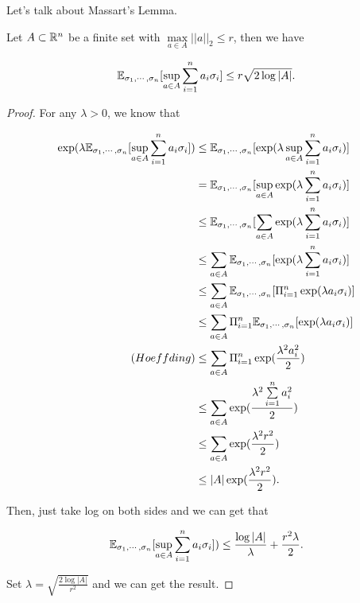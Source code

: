 \documentclass[../main.tex]{subfiles}
\begin{document}
	Let's talk about Massart's Lemma.
	
	\begin{theorem}
		Let $A \subset \mathbb{R}^n$ be a finite set with $\max\limits_{a\in A} ||a||_2 \leq r$, then we have
		
		\begin{equation}
			\mathbb{E}_{\sigma_1, \cdots, \sigma_n} [\sup\limits_{a\in A} \sum\limits_{i=1}^n a_i \sigma_i] \leq r \sqrt{2\log |A|}.
		\end{equation}
	\end{theorem}

	\begin{proof}
		For any $\lambda > 0$, we know that 
		
		\begin{equation*}
			\begin{aligned}
				\exp(\lambda \mathbb{E}_{\sigma_1, \cdots, \sigma_n} [\sup\limits_{a\in A} \sum\limits_{i=1}^n a_i \sigma_i]) &  \leq \mathbb{E}_{\sigma_1, \cdots, \sigma_n} [\exp(\lambda  \sup\limits_{a\in A} \sum\limits_{i=1}^n a_i \sigma_i)] \\
				& = \mathbb{E}_{\sigma_1, \cdots, \sigma_n} [\sup\limits_{a\in A} \exp(\lambda   \sum\limits_{i=1}^n a_i \sigma_i)] \\
				& \leq \mathbb{E}_{\sigma_1, \cdots, \sigma_n} [\sum\limits_{a\in A} \exp(\lambda   \sum\limits_{i=1}^n a_i \sigma_i)] \\
				& \leq \sum\limits_{a\in A} \mathbb{E}_{\sigma_1, \cdots, \sigma_n} [ \exp(\lambda   \sum\limits_{i=1}^n a_i \sigma_i)] \\
				& \leq \sum\limits_{a\in A} \mathbb{E}_{\sigma_1, \cdots, \sigma_n} [ \Pi_{i=1}^n \exp(\lambda  a_i \sigma_i)] \\
				& \leq \sum\limits_{a\in A}  \Pi_{i=1}^n  \mathbb{E}_{\sigma_1, \cdots, \sigma_n} [\exp(\lambda  a_i \sigma_i)] \\
			(Hoeffding)	& \leq \sum\limits_{a\in A}  \Pi_{i=1}^n  \exp(\frac{\lambda^2 a_i^2}{2})\\
				& \leq \sum\limits_{a\in A}   \exp(\frac{\lambda^2  \sum\limits_{i=1}^n a_i^2}{2}) \\
				& \leq \sum\limits_{a\in A}   \exp(\frac{\lambda^2  r^2}{2}) \\
				& \leq |A| \exp(\frac{\lambda^2  r^2}{2}).
			\end{aligned}
		\end{equation*}
		
		Then, just take log on both sides and we can get that 
		
		\begin{equation*}
			\mathbb{E}_{\sigma_1, \cdots, \sigma_n} [\sup\limits_{a\in A} \sum\limits_{i=1}^n a_i \sigma_i])  \leq \frac{\log |A|}{\lambda} + \frac{r^2 \lambda}{2}.
		\end{equation*}
		
		Set $\lambda = \sqrt{\frac{2\log |A|}{r^2}}$ and we can get the result.
	\end{proof}
	
\end{document}
